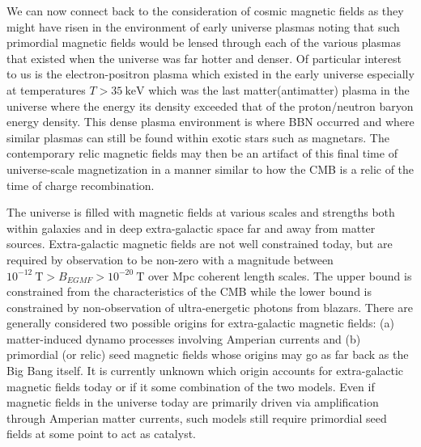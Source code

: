\documentclass[Universe,article,submit,moreauthors,pdftex]{Definitions/mdpi}
\begin{document}
We can now connect back to the consideration of cosmic magnetic fields as they might have risen in the environment of early universe plasmas noting that such primordial magnetic fields would be lensed through each of the various plasmas that existed when the universe was far hotter and denser. Of particular interest to us is the electron-positron plasma which existed in the early universe especially at temperatures $T>35\ \mathrm{keV}$ which was the last matter(antimatter) plasma in the universe where the energy its density exceeded that of the proton/neutron baryon energy density. This dense plasma environment is where BBN occurred and where similar plasmas can still be found within exotic stars such as magnetars. The contemporary relic magnetic fields may then be an artifact of this final time of universe-scale magnetization in a manner similar to how the CMB is a relic of the time of charge recombination.

The universe is filled with magnetic fields at various scales and strengths both within galaxies and in deep extra-galactic space far and away from matter sources. Extra-galactic magnetic fields are not well constrained today, but are required by observation to be non-zero with a magnitude between $10^{-12}\ \mathrm{T}>B_{EGMF}>10^{-20}\ \mathrm{T}$ over Mpc coherent length scales. The upper bound is constrained from the characteristics of the CMB while the lower bound is constrained by non-observation of ultra-energetic photons from blazars. There are generally considered two possible origins for extra-galactic magnetic fields: (a) matter-induced dynamo processes involving Amperian currents and (b) primordial (or relic) seed magnetic fields whose origins may go as far back as the Big Bang itself. It is currently unknown which origin accounts for extra-galactic magnetic fields today or if it some combination of the two models. Even if magnetic fields in the universe today are primarily driven via amplification through Amperian matter currents, such models still require primordial seed fields at some point to act as catalyst.
\end{document}
